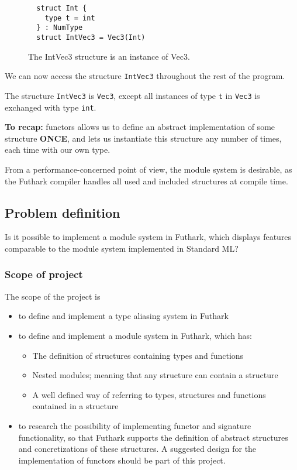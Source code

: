 \begin{figure}
\begin{verbatim}
  struct Int {
    type t = int 
  } : NumType
  struct IntVec3 = Vec3(Int)
\end{verbatim}
\caption{The IntVec3 structure is an instance of Vec3. \label{first_functor_example}}
\end{figure}
We can now access the structure \texttt{IntVec3} throughout the rest of the
program.

The structure \texttt{IntVec3} is \texttt{Vec3}, except all instances of type \texttt{t} in \texttt{Vec3} is exchanged with type \texttt{int}.


\textbf{To recap:} functors allows us to define an abstract implementation of some structure \textbf{ONCE}, and lets us instantiate this structure any number of times, each time with our own type.


From a performance-concerned point of view, the module system is desirable, as the Futhark compiler handles all used and included structures at compile time.
\subsection{Problem definition}
\label{subsec:probdef}
Is it possible to implement a module system in Futhark, which displays features comparable to the module system implemented in Standard ML?

\subsubsection{Scope of project}
\label{subsec:project_scope}
The scope of the project is
\begin{itemize}
  \item to define and implement a type aliasing system in Futhark
  \item to define and implement a module system in Futhark, which has:
    \begin{itemize}
      \item The definition of structures containing types and functions
      \item Nested modules; meaning that any structure can contain a structure
      \item A well defined way of referring to types, structures and functions
        contained in a structure
    \end{itemize}
  \item to research the possibility of implementing functor and signature functionality, so that Futhark supports the definition of abstract structures and concretizations of these structures. A suggested design for the implementation of functors should be part of this project.
\end{itemize}
\clearpage

